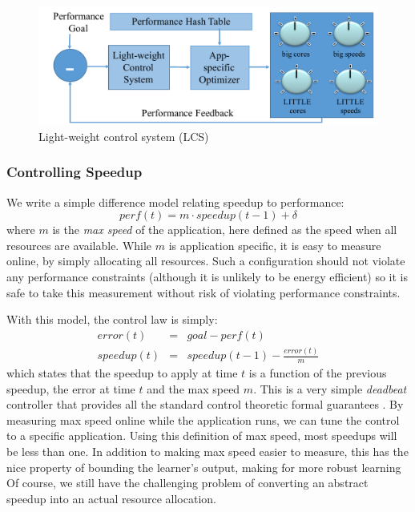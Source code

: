 \begin{figure}
\includegraphics[width=\columnwidth]{figures/LCS.pdf}
\caption{Light-weight control system (LCS) }
  \label{fig:framework:lcs}
\end{figure}


\subsubsection{Controlling Speedup}
We write a simple difference model relating speedup to performance:
\begin{equation}
  perf(t) = m \cdot speedup(t-1) + \delta \label{eqn:speedup}
\end{equation}
where $m$ is the \emph{max speed} of the application, here defined as
the speed when all resources are available.  While $m$ is application
specific, it is easy to measure online, by simply allocating all
resources. Such a configuration should not violate any performance
constraints (although it is unlikely to be energy efficient) so it is
safe to take this measurement without risk of violating performance
constraints.

With this model, the control law is simply:
\begin{eqnarray}
  error(t) &=& goal - perf(t) \label{eqn:speedup-error} \\
  speedup(t) &=& speedup(t-1) - \frac{error(t)}{m}
  \label{eqn:speedup-control}
\end{eqnarray}
which states that the speedup to apply at time $t$ is a function of
the previous speedup, the error at time $t$ and the max speed $m$.
This is a very simple \emph{deadbeat} controller that provides all the
standard control theoretic formal guarantees
\cite{seec-cdc2010,ICSE2014}.  By measuring max speed online while the
application runs, we can tune the control to a specific application.
Using this definition of max speed, most speedups will be less than
one.  In addition to making max speed easier to measure, this has the
nice property of bounding the learner's output, making for more robust
learning  Of course, we still have the challenging problem of
converting an abstract speedup into an actual resource allocation.


